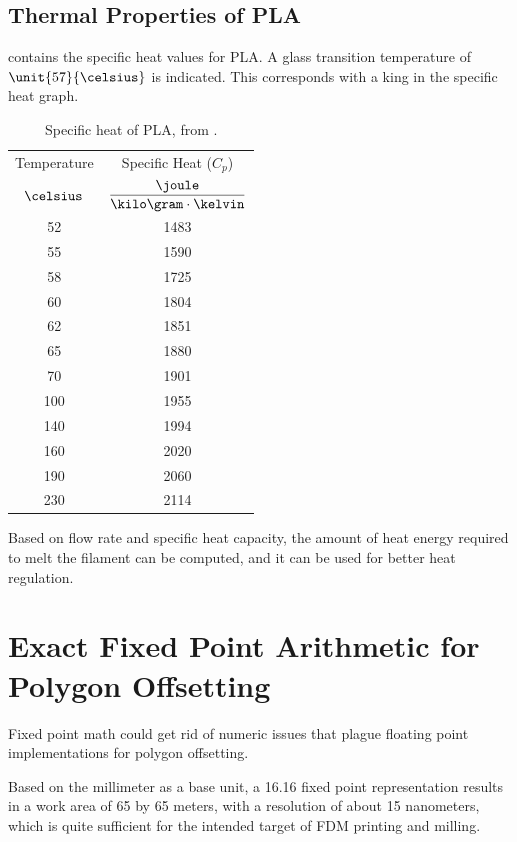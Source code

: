 \documentclass[12pt,a4paper,oneside,openany]{article}
\begin{document}
\subsection{Thermal Properties of PLA}

 contains the specific heat values for PLA. A glass transition temperature of $\unit{57}{\celsius}$ is indicated. This corresponds with a king in the specific heat graph.


\begin{table}[htdp]
\caption{Specific heat of PLA, from \cite{mfr}.}
\begin{center}
\begin{tabular}{cc}
\toprule Temperature & Specific Heat ($C_p$)\\
$\celsius$ & $\dfrac{\joule}{\kilo\gram \cdot \kelvin}$ \\
\midrule 52 & 1483 \\
55 & 1590 \\
58 & 1725 \\
60 & 1804 \\
62 & 1851 \\
65 & 1880 \\
70 & 1901 \\
100 & 1955 \\
140 & 1994 \\
160 & 2020 \\
190 & 2060 \\
230 & 2114 \\
\bottomrule 
\end{tabular}
\end{center}
\label{table:plaheat}
\end{table}%

Based on flow rate and specific heat capacity, the amount of heat energy required to melt the filament can be computed, and it can be used for better heat regulation.

\section{Exact Fixed Point Arithmetic for Polygon Offsetting}

Fixed point math could get rid of numeric issues that plague floating point implementations for polygon offsetting.

Based on the millimeter as a base unit, a 16.16 fixed point representation results in a work area of 65 by 65 meters, with a resolution of about 15 nanometers, which is quite sufficient for the intended target of FDM printing and milling.
\end{document}
